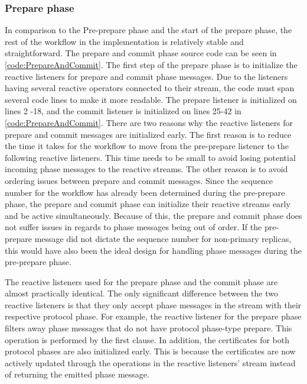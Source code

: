 \subsubsection{Prepare phase}
In comparison to the Pre-prepare phase and the start of the prepare phase, the rest of the workflow in the implementation is relatively stable and straightforward. The prepare and commit phase source code can be seen in \autoref{code:PrepareAndCommit}. The first step of the prepare phase is to initialize the reactive listeners for prepare and commit phase messages. Due to the listeners having several reactive operators connected to their stream, the code must span several code lines to make it more readable. The prepare listener is initialized on lines 2 -18, and the commit listener is initialized on lines 25-42 in \autoref{code:PrepareAndCommit}. There are two reasons why the reactive listeners for prepare and commit messages are initialized early. The first reason is to reduce the time it takes for the workflow to move from the pre-prepare listener to the following reactive listeners. This time needs to be small to avoid losing potential incoming phase messages to the reactive streams. 
The other reason is to avoid ordering issues between prepare and commit messages. Since the sequence number for the workflow has already been determined during the pre-prepare phase, the prepare and commit phase can initialize their reactive streams early and be active simultaneously. Because of this, the prepare and commit phase does not suffer issues in regards to phase messages being out of order. If the pre-prepare message did not dictate the sequence number for non-primary replicas, this would have also been the ideal design for handling phase messages during the pre-prepare phase.

The reactive listeners used for the prepare phase and the commit phase are almost practically identical. The only significant difference between the two reactive listeners is that they only accept phase messages in the stream with their respective protocol phase. For example, the reactive listener for the prepare phase filters away phase messages that do not have protocol phase-type prepare. This operation is performed by the first  clause. In addition, the certificates for both protocol phases are also initialized early. This is because the certificates are now actively updated through the operations in the reactive listeners’ stream instead of returning the emitted phase message.

